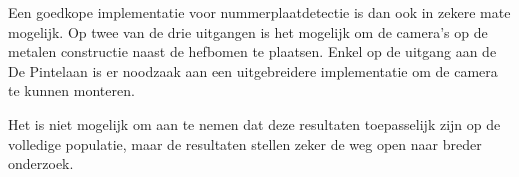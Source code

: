Een goedkope implementatie voor nummerplaatdetectie is dan ook in zekere mate mogelijk. Op twee van de drie uitgangen is het mogelijk om de camera's op de metalen constructie naast de hefbomen te plaatsen. Enkel op de uitgang aan de De Pintelaan is er noodzaak aan een uitgebreidere implementatie om de camera te kunnen monteren.

Het is niet mogelijk om aan te nemen dat deze resultaten toepasselijk zijn op de volledige populatie, maar de resultaten stellen zeker de weg open naar breder onderzoek.

